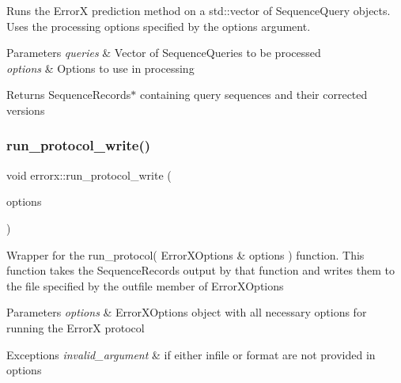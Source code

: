 Runs the ErrorX prediction method on a std\+::vector of Sequence\+Query objects. Uses the processing options specified by the options argument.


\begin{DoxyParams}{Parameters}
{\em queries} & Vector of Sequence\+Queries to be processed \\
\hline
{\em options} & Options to use in processing\\
\hline
\end{DoxyParams}
\begin{DoxyReturn}{Returns}
Sequence\+Records$\ast$ containing query sequences and their corrected versions 
\end{DoxyReturn}
\mbox{\label{errorx_8hh_file_aae98824f02324bd868af3e80d593f45b}} 
\subsubsection{\texorpdfstring{run\+\_\+protocol\+\_\+write()}{run\_protocol\_write()}}
{\footnotesize\ttfamily void errorx\+::run\+\_\+protocol\+\_\+write (\begin{DoxyParamCaption}\item[{\mbox{\hyperlink{classerrorx_1_1_error_x_options}{Error\+X\+Options}} \&}]{options }\end{DoxyParamCaption})}

Wrapper for the run\+\_\+protocol( Error\+X\+Options \& options ) function. This function takes the Sequence\+Records output by that function and writes them to the file specified by the outfile member of Error\+X\+Options


\begin{DoxyParams}{Parameters}
{\em options} & Error\+X\+Options object with all necessary options for running the ErrorX protocol\\
\hline
\end{DoxyParams}

\begin{DoxyExceptions}{Exceptions}
{\em invalid\+\_\+argument} & if either infile or format are not provided in options \\
\hline
\end{DoxyExceptions}
\mbox{\label{errorx_8hh_file_ac68a688383075e5f98f2cbdcc580bbb4}} 
